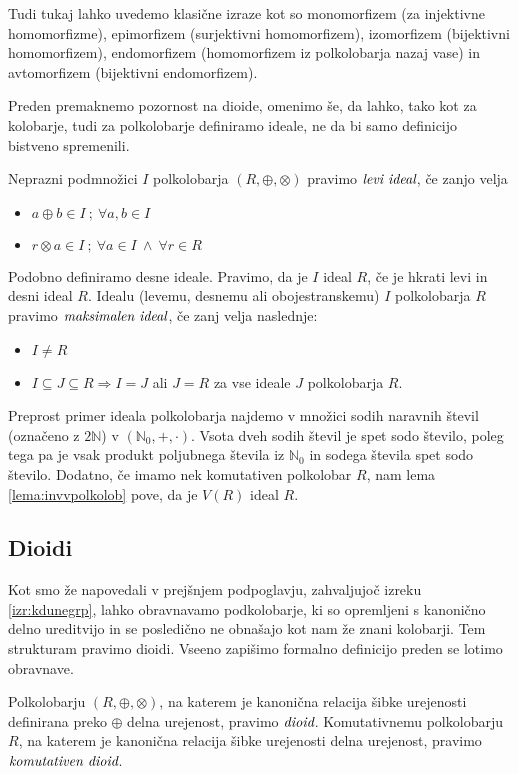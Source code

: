 \documentclass[mat1]{fmfdelo}
\newcommand{\N}{\mathbb{N}}
\newcommand{\No}{\N_0}
\newcommand{\pojem}[1]{\ensuremath{\emph{#1}}}
\begin{document}
Tudi tukaj lahko uvedemo klasične izraze kot so monomorfizem (za injektivne homomorfizme), epimorfizem (surjektivni homomorfizem), izomorfizem (bijektivni homomorfizem), endomorfizem (homomorfizem iz polkolobarja nazaj vase) in avtomorfizem (bijektivni endomorfizem).

Preden premaknemo pozornost na dioide, omenimo še, da lahko, tako kot za kolobarje, tudi za polkolobarje definiramo ideale, ne da bi samo definicijo bistveno spremenili.

\begin{definicija}
	Neprazni podmnožici $I$ polkolobarja $(R, \oplus, \otimes)$ pravimo \pojem{levi ideal}, če zanjo velja \begin{itemize}
		\item $a \oplus b \in I~;~\forall a, b\in I$
		\item $r\otimes a \in I~;~\forall a\in I~\land~\forall r\in R$ 
	\end{itemize}
	Podobno definiramo desne ideale. Pravimo, da je $I$ ideal $R$, če je hkrati levi in desni ideal $R$.
	Idealu (levemu, desnemu ali obojestranskemu) $I$ polkolobarja $R$ pravimo \pojem{maksimalen ideal}, če zanj velja naslednje: \begin{itemize}
		\item $I \neq R$
		\item $I \subseteq J \subseteq R \Rightarrow I = J$ ali $J = R$ za vse ideale $J$ polkolobarja $R$.
	\end{itemize}
\end{definicija}
Preprost primer ideala polkolobarja najdemo v množici sodih naravnih števil (označeno z $2\N$) v $(\No, +, \cdot)$. Vsota dveh sodih števil je spet sodo število, poleg tega pa je vsak produkt poljubnega števila iz $\No$ in sodega števila spet sodo število. Dodatno, če imamo nek komutativen polkolobar $R$, nam lema \ref{lema:invvpolkolob} pove, da je $V(R)$ ideal $R$.

\subsection{Dioidi}\label{subsect:dioid}
Kot smo že napovedali v prejšnjem podpoglavju, zahvaljujoč izreku \ref{izr:kdunegrp}, lahko obravnavamo podkolobarje, ki so opremljeni s kanonično delno ureditvijo in se posledično ne obnašajo kot nam že znani kolobarji. Tem strukturam pravimo dioidi. Vseeno zapišimo formalno definicijo preden se lotimo obravnave.
\begin{definicija}
	Polkolobarju $(R, \oplus, \otimes)$, na katerem je kanonična relacija šibke urejenosti definirana preko $\oplus$ delna urejenost, pravimo \pojem{dioid}. Komutativnemu polkolobarju $R$, na katerem je kanonična relacija šibke urejenosti delna urejenost, pravimo \pojem{komutativen dioid}.
\end{definicija}
	
\end{document}
